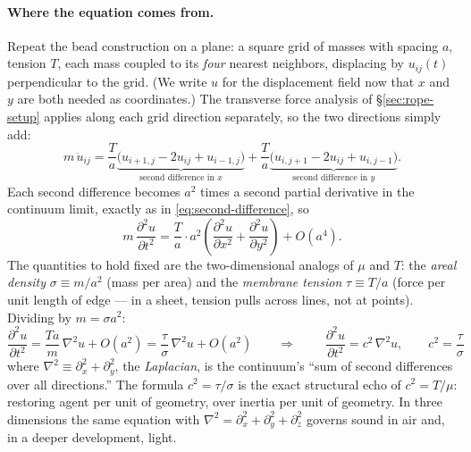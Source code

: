\documentclass[11pt]{article}
\theoremstyle{plain}
\theoremstyle{definition}
\theoremstyle{remark}
\begin{document}
\paragraph{Where the equation comes from.}
Repeat the bead construction on a plane: a square grid of masses with
spacing $a$, tension $T$, each mass coupled to its \emph{four} nearest
neighbors, displacing by $u_{ij}(t)$ perpendicular to the grid. (We write
$u$ for the displacement field now that $x$ and $y$ are both needed as
coordinates.) The transverse force analysis of \S\ref{sec:rope-setup}
applies along each grid direction separately, so the two directions simply
add:
\begin{equation}
  m\,\ddot u_{ij}
  = \frac{T}{a}\underbrace{\bigl(u_{i+1,j} - 2u_{ij} + u_{i-1,j}\bigr)}_{\text{second difference in }x}
  + \frac{T}{a}\underbrace{\bigl(u_{i,j+1} - 2u_{ij} + u_{i,j-1}\bigr)}_{\text{second difference in }y} .
\end{equation}
Each second difference becomes $a^2$ times a second partial derivative in
the continuum limit, exactly as in \eqref{eq:second-difference}, so
\begin{equation}
  m\,\frac{\partial^2 u}{\partial t^2}
  = \frac{T}{a}\cdot a^2\left(\frac{\partial^2 u}{\partial x^2}
  + \frac{\partial^2 u}{\partial y^2}\right) + O(a^4).
\end{equation}
The quantities to hold fixed are the two-dimensional analogs of $\mu$ and
$T$: the \emph{areal density} $\sigma \equiv m/a^2$ (mass per area) and the
\emph{membrane tension} $\tau \equiv T/a$ (force per unit length of edge ---
in a sheet, tension pulls across lines, not at points). Dividing by
$m = \sigma a^2$:
\begin{equation}
  \frac{\partial^2 u}{\partial t^2}
  = \frac{T a}{m}\,\nabla^2 u + O(a^2)
  = \frac{\tau}{\sigma}\,\nabla^2 u + O(a^2)
  \qquad\Longrightarrow\qquad
  \boxed{\;
  \frac{\partial^2 u}{\partial t^2}
  = c^2\,\nabla^2 u,
  \qquad
  c^2 = \frac{\tau}{\sigma}
  \;}
\end{equation}
where $\nabla^2 \equiv \partial_x^2 + \partial_y^2$, the \emph{Laplacian},
is the continuum's ``sum of second differences over all directions.'' The
formula $c^2 = \tau/\sigma$ is the exact structural echo of $c^2 = T/\mu$:
restoring agent per unit of geometry, over inertia per unit of geometry. In
three dimensions the same equation with
$\nabla^2 = \partial_x^2 + \partial_y^2 + \partial_z^2$ governs sound in
air and, in a deeper development, light.
\end{document}
